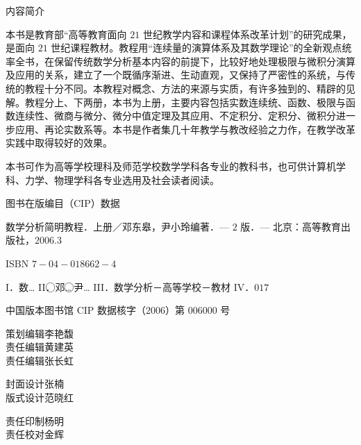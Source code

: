 
\begingroup
\pagestyle{empty}

{\headfont{} 内容简介\par}
\vspace{0.5em}

本书是教育部``高等教育面向 $21$ 世纪教学内容和课程体系改革计划''的研究成果，是面向 $21$ 世纪课程教材。教程用``连续量的演算体系及其数学理论''的全新观点统率全书，在保留传统数学分析基本内容的前提下，比较好地处理极限与微积分演算及应用的关系，建立了一个既循序渐进、生动直观，又保持了严密性的系统，与传统的教程十分不同。本教程对概念、方法的来源与实质，有许多独到的、精辟的见解。教程分上、下两册，本书为上册，主要内容包括实数连续统、函数、极限与函数连续性、微商与微分、微分中值定理及其应用、不定积分、定积分、微积分进一步应用、再论实数系等。本书是作者集几十年教学与教改经验之力作，在教学改革实践中取得较好的效果。

本书可作为高等学校理科及师范学校数学学科各专业的教科书，也可供计算机学科、力学、物理学科各专业选用及社会读者阅读。

\vspace{1em}
{\headfont{} 图书在版编目（CIP）数据\par}
\vspace{0.3em}

数学分析简明教程．上册／邓东皋，尹小玲编著．— $2$ 版．— 北京：高等教育出版社，$2006.3$

ISBN $7-04-018662-4$

{\rmfamily I}．数… {\rmfamily II}．\textcircled{}邓… \textcircled{}尹… {\rmfamily III}．数学分析－高等学校－教材 {\rmfamily IV}．$017$

中国版本图书馆 CIP 数据核字（$2006$）第 $006000$ 号

\vspace{0.8em}
\noindent
\begin{minipage}[t]{0.32\textwidth}
策划编辑\quad 李艳馥\\
责任编辑\quad 黄建英\\
责任编辑\quad 张长虹
\end{minipage}%
\begin{minipage}[t]{0.32\textwidth}
封面设计\quad 张\hspace{1em}楠\\
版式设计\quad 范晓红
\end{minipage}%
\begin{minipage}[t]{0.32\textwidth}
责任印制\quad 杨\hspace{1em}明\\
责任校对\quad 金\hspace{1em}辉
\end{minipage}

